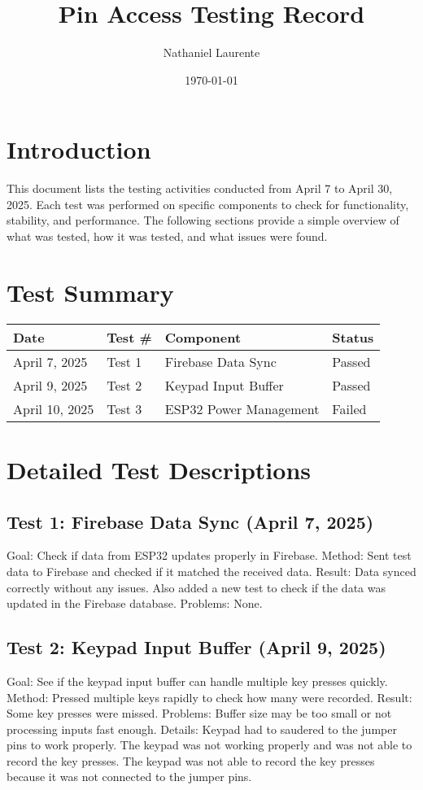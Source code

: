 \documentclass{article}
\title{Pin Access Testing Record}
\author{Nathaniel Laurente}
\date{\today}
\begin{document}
\maketitle

\section*{Introduction}
This document lists the testing activities conducted from April 7 to April 30, 2025. Each test was performed on specific components to check for functionality, stability, and performance. The following sections provide a simple overview of what was tested, how it was tested, and what issues were found.

\section*{Test Summary}
\begin{tabular}{| l | l | l | l |}
\hline
\textbf{Date} & \textbf{Test \#} & \textbf{Component} & \textbf{Status} \\
\hline
April 7, 2025 & Test 1 & Firebase Data Sync & Passed \\
April 9, 2025 & Test 2 & Keypad Input Buffer & Passed \\
April 10, 2025 & Test 3 & ESP32 Power Management & Failed \\


\hline
\end{tabular}

\section*{Detailed Test Descriptions}

\subsection*{Test 1: Firebase Data Sync (April 7, 2025)}
Goal: Check if data from ESP32 updates properly in Firebase.
Method: Sent test data to Firebase and checked if it matched the received data.
Result: Data synced correctly without any issues. Also added a new test to check if the data was updated in the Firebase database.
Problems: None.

\subsection*{Test 2: Keypad Input Buffer (April 9, 2025)}
Goal: See if the keypad input buffer can handle multiple key presses quickly.
Method: Pressed multiple keys rapidly to check how many were recorded.
Result: Some key presses were missed.
Problems: Buffer size may be too small or not processing inputs fast enough.
Details: Keypad had to saudered to the jumper pins to work properly. The keypad was not working properly and was not able to record the key presses. The keypad was not able to record the key presses because it was not connected to the jumper pins. 
\end{document}
